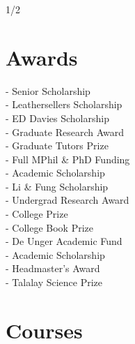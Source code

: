 \documentclass[a4paper]{custom-resume}
\begin{document}
\vfill
\begin{center}
1/2
\end{center}


\newpage

\vfill

\begin{minipage}[t][0.8\textheight]{0.33\textwidth}


\section{Awards}

\begin{flushleft}
  - Senior Scholarship \\
                                - Leathersellers Scholarship \\
                                - ED Davies Scholarship \\
                                - Graduate Research Award \\
                                - Graduate Tutors Prize \\
                                - Full MPhil \& PhD Funding \\ \vspace{4pt}
     - Academic Scholarship \\
                                - Li \& Fung Scholarship \\
                                - Undergrad Research Award \\
                                - College Prize \\
                                - College Book Prize \\
                                - De Unger Academic Fund \\ \vspace{4pt}
        - Academic Scholarship \\
                                - Headmaster’s Award \\
                                - Talalay Science Prize
\end{flushleft}


\section{Courses}


\end{minipage}
\end{document}
